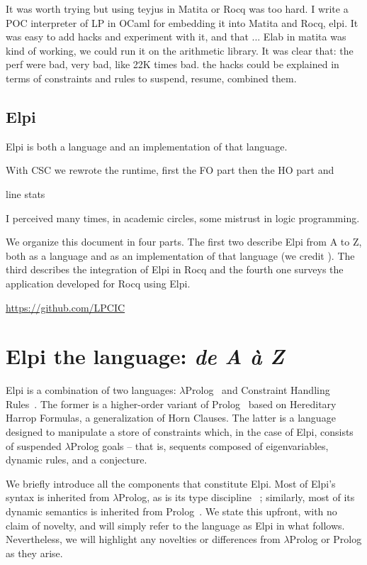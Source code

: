 \documentclass[a4paper, 11pt]{book}
\begin{document}
It was worth trying but using teyjus in Matita or Rocq was too hard.
I write a POC interpreter of LP in OCaml for embedding it into
Matita and Rocq, elpi. It was easy to add hacks and experiment with
it, and that ... Elab in matita was kind of working, we could run
it on the arithmetic library. It was clear that:
the perf were bad, very bad, like 22K times bad.
the hacks could be explained in terms of constraints and rules to
suspend, resume, combined them.


\section{Elpi}
Elpi is both a language and an implementation of that language.

With CSC we rewrote the runtime, first the FO part then the HO part
and 

line stats

I perceived many times, in academic circles, some mistrust in logic programming.


We organize this document in four parts. The first two describe Elpi from
A to Z, both as a language and as an implementation of that language (we credit
\cite{ridoux1998lambda}). The third describes the integration of Elpi in Rocq
and the fourth one surveys the application developed for Rocq using Elpi.

\url{https://github.com/LPCIC}

\chapter{Elpi the language: \emph{de A \`a Z}}


Elpi is a combination of two languages: $\lambda$Prolog~\cite{10.1093/logcom/1.4.497,Miller_Nadathur_2012}
and Constraint Handling Rules~\cite{FRUHWIRTH199895,chr}. The former is a
higher-order variant of Prolog~\cite{prolog0,prolog} based on Hereditary
Harrop Formulas, a generalization of Horn Clauses. The latter is a language
designed to manipulate a store of constraints which, in the case of Elpi,
consists of suspended $\lambda$Prolog goals -- that is, sequents composed of
eigenvariables, dynamic rules, and a conjecture.

We briefly introduce all the components that constitute Elpi. Most of Elpi's
syntax is inherited from $\lambda$Prolog, as is its type discipline
~\cite{Miller_Nadathur_2012}; similarly, most of its dynamic semantics is
inherited from Prolog~\cite{1989Vink}.
We state this upfront, with no claim of novelty, and
will simply refer to the language as Elpi in what follows. Nevertheless, we
will highlight any novelties or differences from $\lambda$Prolog or Prolog as
they arise.
\end{document}
